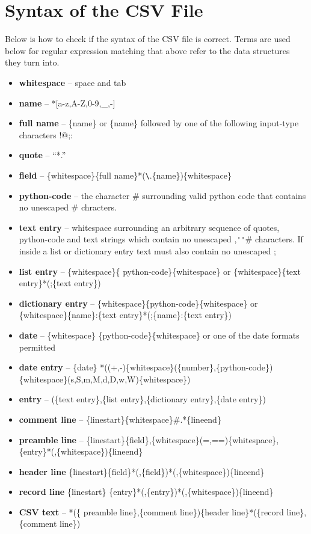 \documentclass{article}
\begin{document}
\section*{Syntax of the CSV File}

Below is how to check if the syntax of the CSV file is correct.  Terms
are used below for regular expression matching  that above refer
to the data structures they turn into.  
\begin{itemize}
\item \textbf{whitespace} -- space and tab
\item \textbf{name} -- *[a-z,A-Z,0-9,\_,-]
\item \textbf{full name} -- \{name\} or \{name\} followed by one of the
  following input-type characters !@;:
\item \textbf{quote} -- ``*.''
\item \textbf{field} -- \{whitespace\}\{full
  name\}*(\verb|\|.\{name\})\{whitespace\}
\item \textbf{python-code} -- the character \# surrounding valid
  python code that contains no unescaped \# chracters.
\item \textbf{text entry} -- whitespace surrounding an arbitrary
  sequence of {quote}s, {python-code} and text strings which contain
  no unescaped ,\verb|''|\# characters.  If inside a list or
  dictionary entry text must also contain no unescaped ;
\item \textbf{list entry} -- \{whitespace\}\{ python-code\}\{whitespace\}
  or \{whitespace\}\{text entry\}*(;\{text entry\})
\item \textbf{dictionary entry} -- \{whitespace\}\{python-code\}\{whitespace\}
  or \{whitespace\}\{name\}:\{text entry\}*(;\{name\}:\{text entry\})
\item \textbf{date} -- \{whitespace\} \{python-code\}\{whitespace\}
  or one of the date formats permitted
\item \textbf{date entry} -- \{date\} *((+,-)\{whitespace\}(\{number\},\{python-code\})\{whitespace\}(s,S,m,M,d,D,w,W)\{whitespace\})
\item \textbf{entry} -- (\{text entry\},\{list entry\},\{dictionary entry\},\{date entry\})
\item \textbf{comment line} -- \{linestart\}\{whitespace\}\#.*\{lineend\}
\item \textbf{preamble line} -- 
  \{linestart\}\{field\},\{whitespace\}(=,==)\{whitespace\},\{entry\}*(,\{whitespace\})\{lineend\}
\item \textbf{header line} \{linestart\}\{field\}*(,\{field\})*(,\{whitespace\})\{lineend\}
\item \textbf{record line} \{linestart\}
  \{entry\}*(,\{entry\})*(,\{whitespace\})\{lineend\}
\item \textbf{CSV text} -- *(\{ preamble line\},\{comment line\})\{header
  line\}*(\{record line\},\{comment line\})
\end{itemize}
\end{document}
